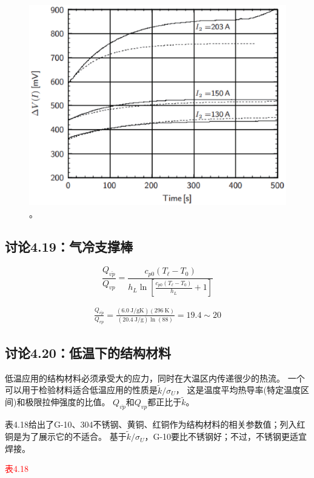 \begin{figure}[htbp]
	\centering
	\includegraphics[scale=0.7]{chpt4/figs/fig4.26.eps}
	\caption{。}
\end{figure}


\subsection{讨论4.19：气冷支撑棒}
\begin{equation}%
\frac{Q_{\bar{vp}}}{Q_{vp}}=\frac{c_{p0}(T_\ell-T_0)}{h_L\ln\left[\frac{c_{p0}(T_\ell-T_0)}{h_L}+1\right]}
\end{equation}

\begin{align*}
\frac{Q_{\bar{vp}}}{Q_{vp}}=\frac{(6.0\ \mathrm{J/gK})(296\ \mathrm{K})}{(20.4\ \mathrm{J/g})\ln(88)}=19.4\sim 20
\end{align*}



\subsection{讨论4.20：低温下的结构材料}
低温应用的结构材料必须承受大的应力，同时在大温区内传递很少的热流。
一个可以用于检验材料适合低温应用的性质是$\tilde{k}/\sigma_U$，
这是温度平均热导率(特定温度区间)和极限拉伸强度的比值。
$Q_{\bar{vp}}$和$Q_{vp}$都正比于$\tilde{k}$。

表4.18给出了G-10、304不锈钢、黄铜、红铜作为结构材料的相关参数值；列入红铜是为了展示它的不适合。
基于$\tilde{k}/\sigma_U$，G-10要比不锈钢好；不过，不锈钢更适宜焊接。

\textcolor{red}{表4.18}